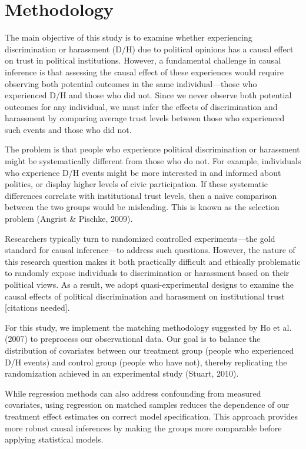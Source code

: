 \documentclass{article}
\begin{document}


\section{Methodology}

The main objective of this study is to examine whether experiencing discrimination or harassment (D/H) due to political opinions has a causal effect on trust in political institutions. However, a fundamental challenge in causal inference is that assessing the causal effect of these experiences would require observing both potential outcomes in the same individual—those who experienced D/H and those who did not. Since we never observe both potential outcomes for any individual, we must infer the effects of discrimination and harassment by comparing average trust levels between those who experienced such events and those who did not.

The problem is that people who experience political discrimination or harassment might be systematically different from those who do not. For example, individuals who experience D/H events might be more interested in and informed about politics, or display higher levels of civic participation. If these systematic differences correlate with institutional trust levels, then a naïve comparison between the two groups would be misleading. This is known as the selection problem (Angrist \& Pischke, 2009).

Researchers typically turn to randomized controlled experiments—the gold standard for causal inference—to address such questions. However, the nature of this research question makes it both practically difficult and ethically problematic to randomly expose individuals to discrimination or harassment based on their political views. As a result, we adopt quasi-experimental designs to examine the causal effects of political discrimination and harassment on institutional trust [citations needed].

For this study, we implement the matching methodology suggested by Ho et al. (2007) to preprocess our observational data. Our goal is to balance the distribution of covariates between our treatment group (people who experienced D/H events) and control group (people who have not), thereby replicating the randomization achieved in an experimental study (Stuart, 2010).

While regression methods can also address confounding from measured covariates, using regression on matched samples reduces the dependence of our treatment effect estimates on correct model specification. This approach provides more robust causal inferences by making the groups more comparable before applying statistical models.
\end{document}
